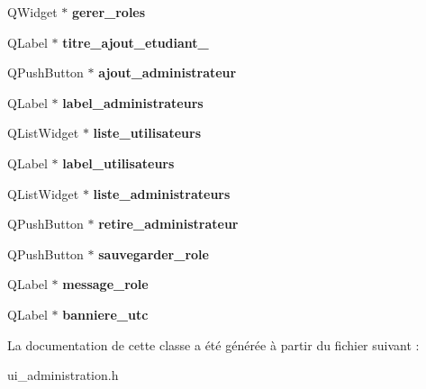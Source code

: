 \begin{DoxyCompactItemize}
\item 
\hypertarget{class_ui___administration_a43123315c35fe24c0179a97c05d095a7}{Q\+Widget $\ast$ {\bfseries gerer\+\_\+roles}}\label{class_ui___administration_a43123315c35fe24c0179a97c05d095a7}

\item 
\hypertarget{class_ui___administration_a1812da30c2c569e3f8feb709b1e041a6}{Q\+Label $\ast$ {\bfseries titre\+\_\+ajout\+\_\+etudiant\+\_}}\label{class_ui___administration_a1812da30c2c569e3f8feb709b1e041a6}

\item 
\hypertarget{class_ui___administration_a2d322ad46921a51360d13a18ab686d6b}{Q\+Push\+Button $\ast$ {\bfseries ajout\+\_\+administrateur}}\label{class_ui___administration_a2d322ad46921a51360d13a18ab686d6b}

\item 
\hypertarget{class_ui___administration_a19121b37e4ad4b3c64e41364df216753}{Q\+Label $\ast$ {\bfseries label\+\_\+administrateurs}}\label{class_ui___administration_a19121b37e4ad4b3c64e41364df216753}

\item 
\hypertarget{class_ui___administration_ab95db75c250328fa0756f3a4ae430b61}{Q\+List\+Widget $\ast$ {\bfseries liste\+\_\+utilisateurs}}\label{class_ui___administration_ab95db75c250328fa0756f3a4ae430b61}

\item 
\hypertarget{class_ui___administration_a5bb96cb7317c88aac00bb2020776ac4e}{Q\+Label $\ast$ {\bfseries label\+\_\+utilisateurs}}\label{class_ui___administration_a5bb96cb7317c88aac00bb2020776ac4e}

\item 
\hypertarget{class_ui___administration_ac3ca57d5d4959161e8955a26429cf420}{Q\+List\+Widget $\ast$ {\bfseries liste\+\_\+administrateurs}}\label{class_ui___administration_ac3ca57d5d4959161e8955a26429cf420}

\item 
\hypertarget{class_ui___administration_a9347dd7537d211dbb0e78ee6dd4f3d0a}{Q\+Push\+Button $\ast$ {\bfseries retire\+\_\+administrateur}}\label{class_ui___administration_a9347dd7537d211dbb0e78ee6dd4f3d0a}

\item 
\hypertarget{class_ui___administration_a8b76877524bf629c68d820b3dab9d633}{Q\+Push\+Button $\ast$ {\bfseries sauvegarder\+\_\+role}}\label{class_ui___administration_a8b76877524bf629c68d820b3dab9d633}

\item 
\hypertarget{class_ui___administration_af85103780ee8f3920cdb39bbafcc021d}{Q\+Label $\ast$ {\bfseries message\+\_\+role}}\label{class_ui___administration_af85103780ee8f3920cdb39bbafcc021d}

\item 
\hypertarget{class_ui___administration_ad7c798d84364a61505d09857eb9505d1}{Q\+Label $\ast$ {\bfseries banniere\+\_\+utc}}\label{class_ui___administration_ad7c798d84364a61505d09857eb9505d1}

\end{DoxyCompactItemize}


La documentation de cette classe a été générée à partir du fichier suivant \+:\begin{DoxyCompactItemize}
\item 
ui\+\_\+administration.\+h\end{DoxyCompactItemize}
